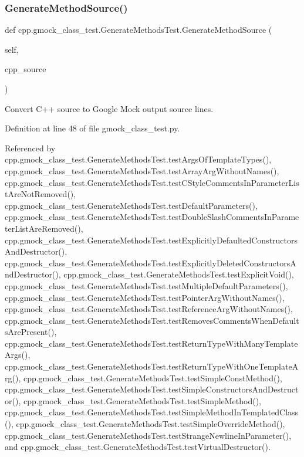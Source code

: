 \subsubsection{\texorpdfstring{Generate\+Method\+Source()}{GenerateMethodSource()}}
{\footnotesize\ttfamily def cpp.\+gmock\+\_\+class\+\_\+test.\+Generate\+Methods\+Test.\+Generate\+Method\+Source (\begin{DoxyParamCaption}\item[{}]{self,  }\item[{}]{cpp\+\_\+source }\end{DoxyParamCaption})}

\begin{DoxyVerb}Convert C++ source to Google Mock output source lines.\end{DoxyVerb}
 

Definition at line 48 of file gmock\+\_\+class\+\_\+test.\+py.



Referenced by cpp.\+gmock\+\_\+class\+\_\+test.\+Generate\+Methods\+Test.\+test\+Args\+Of\+Template\+Types(), cpp.\+gmock\+\_\+class\+\_\+test.\+Generate\+Methods\+Test.\+test\+Array\+Arg\+Without\+Names(), cpp.\+gmock\+\_\+class\+\_\+test.\+Generate\+Methods\+Test.\+test\+C\+Style\+Comments\+In\+Parameter\+List\+Are\+Not\+Removed(), cpp.\+gmock\+\_\+class\+\_\+test.\+Generate\+Methods\+Test.\+test\+Default\+Parameters(), cpp.\+gmock\+\_\+class\+\_\+test.\+Generate\+Methods\+Test.\+test\+Double\+Slash\+Comments\+In\+Parameter\+List\+Are\+Removed(), cpp.\+gmock\+\_\+class\+\_\+test.\+Generate\+Methods\+Test.\+test\+Explicitly\+Defaulted\+Constructors\+And\+Destructor(), cpp.\+gmock\+\_\+class\+\_\+test.\+Generate\+Methods\+Test.\+test\+Explicitly\+Deleted\+Constructors\+And\+Destructor(), cpp.\+gmock\+\_\+class\+\_\+test.\+Generate\+Methods\+Test.\+test\+Explicit\+Void(), cpp.\+gmock\+\_\+class\+\_\+test.\+Generate\+Methods\+Test.\+test\+Multiple\+Default\+Parameters(), cpp.\+gmock\+\_\+class\+\_\+test.\+Generate\+Methods\+Test.\+test\+Pointer\+Arg\+Without\+Names(), cpp.\+gmock\+\_\+class\+\_\+test.\+Generate\+Methods\+Test.\+test\+Reference\+Arg\+Without\+Names(), cpp.\+gmock\+\_\+class\+\_\+test.\+Generate\+Methods\+Test.\+test\+Removes\+Comments\+When\+Defaults\+Are\+Present(), cpp.\+gmock\+\_\+class\+\_\+test.\+Generate\+Methods\+Test.\+test\+Return\+Type\+With\+Many\+Template\+Args(), cpp.\+gmock\+\_\+class\+\_\+test.\+Generate\+Methods\+Test.\+test\+Return\+Type\+With\+One\+Template\+Arg(), cpp.\+gmock\+\_\+class\+\_\+test.\+Generate\+Methods\+Test.\+test\+Simple\+Const\+Method(), cpp.\+gmock\+\_\+class\+\_\+test.\+Generate\+Methods\+Test.\+test\+Simple\+Constructors\+And\+Destructor(), cpp.\+gmock\+\_\+class\+\_\+test.\+Generate\+Methods\+Test.\+test\+Simple\+Method(), cpp.\+gmock\+\_\+class\+\_\+test.\+Generate\+Methods\+Test.\+test\+Simple\+Method\+In\+Templated\+Class(), cpp.\+gmock\+\_\+class\+\_\+test.\+Generate\+Methods\+Test.\+test\+Simple\+Override\+Method(), cpp.\+gmock\+\_\+class\+\_\+test.\+Generate\+Methods\+Test.\+test\+Strange\+Newline\+In\+Parameter(), and cpp.\+gmock\+\_\+class\+\_\+test.\+Generate\+Methods\+Test.\+test\+Virtual\+Destructor().


